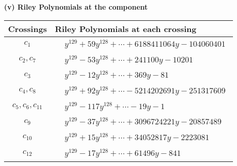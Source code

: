 \documentclass[1p]{elsarticle_modified}
\theoremstyle{definition}
\begin{document}
\newpage\renewcommand{\arraystretch}{1}
\flushleft \textbf{(v) Riley Polynomials at the component}\newline \\
\begin{tabular}{m{50pt}|m{274pt}}
Crossings & \hspace{64pt}Riley Polynomials at each crossing \\
\hline $$\begin{aligned}c_{1}\end{aligned}$$&$\begin{aligned}
&y^{129}+59 y^{128}+\cdots+6188411064 y-104060401
\end{aligned}$\\
\hline $$\begin{aligned}c_{2},c_{7}\end{aligned}$$&$\begin{aligned}
&y^{129}-53 y^{128}+\cdots+241100 y-10201
\end{aligned}$\\
\hline $$\begin{aligned}c_{3}\end{aligned}$$&$\begin{aligned}
&y^{129}-12 y^{128}+\cdots+369 y-81
\end{aligned}$\\
\hline $$\begin{aligned}c_{4},c_{8}\end{aligned}$$&$\begin{aligned}
&y^{129}+92 y^{128}+\cdots-5214202691 y-251317609
\end{aligned}$\\
\hline $$\begin{aligned}c_{5},c_{6},c_{11}\end{aligned}$$&$\begin{aligned}
&y^{129}-117 y^{128}+\cdots-19 y-1
\end{aligned}$\\
\hline $$\begin{aligned}c_{9}\end{aligned}$$&$\begin{aligned}
&y^{129}-37 y^{128}+\cdots+3096724221 y-20857489
\end{aligned}$\\
\hline $$\begin{aligned}c_{10}\end{aligned}$$&$\begin{aligned}
&y^{129}+15 y^{128}+\cdots+34052817 y-2223081
\end{aligned}$\\
\hline $$\begin{aligned}c_{12}\end{aligned}$$&$\begin{aligned}
&y^{129}-17 y^{128}+\cdots+61496 y-841
\end{aligned}$\\
\hline
\end{tabular}\\~\\
\end{document}
